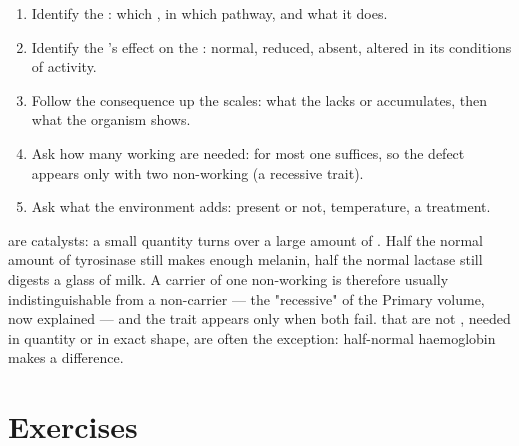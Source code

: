\begin{method}\label{met:g11:enzymes-and-phenotype:reason}
\begin{enumerate}
  \item Identify the : which , in which pathway, and
        what it does.
  \item Identify the 's effect on the : normal, reduced,
        absent, altered in its conditions of activity.
  \item Follow the consequence up the scales: what the  lacks or
        accumulates, then what the organism shows.
  \item Ask how many working  are needed: for most  one
        suffices, so the defect appears only with two non-working
         (a recessive trait).
  \item Ask what the environment adds:  present or not,
        temperature, a treatment.
\end{enumerate}
\end{method}

\begin{remark}\label{rem:g11:enzymes-and-phenotype:recessive}
 are catalysts: a small quantity turns over a large amount of
. Half the normal amount of tyrosinase still makes enough
melanin, half the normal lactase still digests a glass of milk. A
carrier of one non-working  is therefore usually
indistinguishable from a non-carrier --- the "recessive" of the
Primary volume, now explained --- and the trait appears only when
both  fail.  that are not , needed in
quantity or in exact shape, are often the exception: half-normal
haemoglobin makes a difference.
\end{remark}

\section{Exercises}

